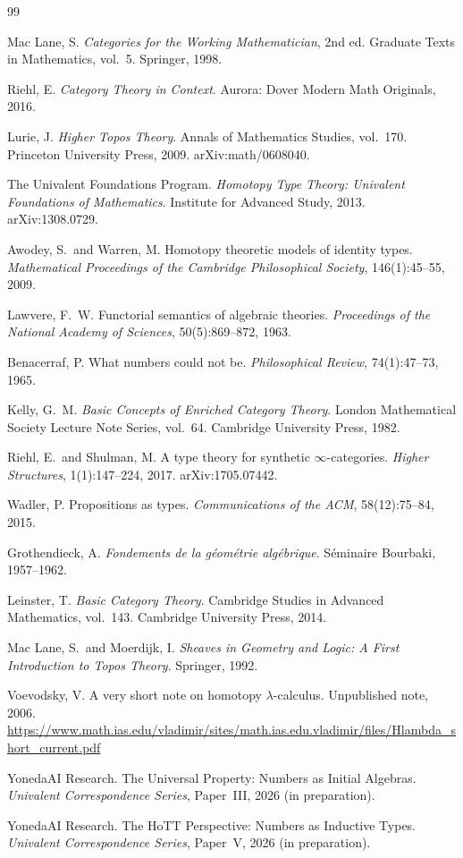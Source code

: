 \documentclass[12pt]{article}
\theoremstyle{definition}
\theoremstyle{remark}
\begin{document}
\begin{thebibliography}{99}

Mac Lane, S.
\emph{Categories for the Working Mathematician}, 2nd ed.
Graduate Texts in Mathematics, vol.~5. Springer, 1998.

Riehl, E.
\emph{Category Theory in Context}.
Aurora: Dover Modern Math Originals, 2016.

Lurie, J.
\emph{Higher Topos Theory}.
Annals of Mathematics Studies, vol.~170. Princeton University Press, 2009.
arXiv:math/0608040.

The Univalent Foundations Program.
\emph{Homotopy Type Theory: Univalent Foundations of Mathematics}.
Institute for Advanced Study, 2013. arXiv:1308.0729.

Awodey, S.\ and Warren, M.
Homotopy theoretic models of identity types.
\emph{Mathematical Proceedings of the Cambridge Philosophical Society}, 146(1):45--55, 2009.

Lawvere, F.~W.
Functorial semantics of algebraic theories.
\emph{Proceedings of the National Academy of Sciences}, 50(5):869--872, 1963.

Benacerraf, P.
What numbers could not be.
\emph{Philosophical Review}, 74(1):47--73, 1965.

Kelly, G.~M.
\emph{Basic Concepts of Enriched Category Theory}.
London Mathematical Society Lecture Note Series, vol.~64. Cambridge University Press, 1982.

Riehl, E.\ and Shulman, M.
A type theory for synthetic $\infty$-categories.
\emph{Higher Structures}, 1(1):147--224, 2017. arXiv:1705.07442.

Wadler, P.
Propositions as types.
\emph{Communications of the ACM}, 58(12):75--84, 2015.

Grothendieck, A.
\emph{Fondements de la g\'eom\'etrie alg\'ebrique}.
S\'eminaire Bourbaki, 1957--1962.

Leinster, T.
\emph{Basic Category Theory}.
Cambridge Studies in Advanced Mathematics, vol.~143. Cambridge University Press, 2014.

Mac Lane, S.\ and Moerdijk, I.
\emph{Sheaves in Geometry and Logic: A First Introduction to Topos Theory}.
Springer, 1992.

Voevodsky, V.
A very short note on homotopy $\lambda$-calculus.
Unpublished note, 2006. \url{https://www.math.ias.edu/vladimir/sites/math.ias.edu.vladimir/files/Hlambda_short_current.pdf}

YonedaAI Research.
The Universal Property: Numbers as Initial Algebras.
\emph{Univalent Correspondence Series}, Paper~III, 2026 (in preparation).

YonedaAI Research.
The HoTT Perspective: Numbers as Inductive Types.
\emph{Univalent Correspondence Series}, Paper~V, 2026 (in preparation).

\end{thebibliography}
\end{document}
